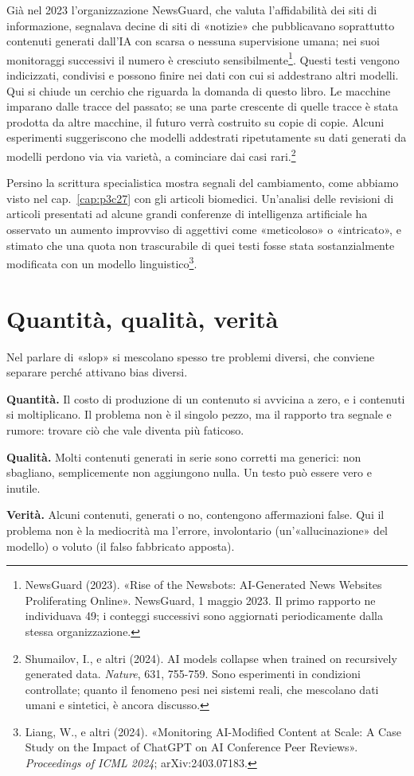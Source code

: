 Già nel 2023 l'organizzazione NewsGuard, che valuta l'affidabilità dei siti di informazione, segnalava decine di siti di «notizie» che pubblicavano soprattutto contenuti generati dall'IA con scarsa o nessuna supervisione umana; nei suoi monitoraggi successivi il numero è cresciuto sensibilmente\footnote{NewsGuard (2023). «Rise of the Newsbots: AI-Generated News Websites Proliferating Online». NewsGuard, 1 maggio 2023. Il primo rapporto ne individuava 49; i conteggi successivi sono aggiornati periodicamente dalla stessa organizzazione.}. Questi testi vengono indicizzati, condivisi e possono finire nei dati con cui si addestrano altri modelli. Qui si chiude un cerchio che riguarda la domanda di questo libro. Le macchine imparano dalle tracce del passato; se una parte crescente di quelle tracce è stata prodotta da altre macchine, il futuro verrà costruito su copie di copie. Alcuni esperimenti suggeriscono che modelli addestrati ripetutamente su dati generati da modelli perdono via via varietà, a cominciare dai casi rari.\footnote{Shumailov, I., e altri (2024). AI models collapse when trained on recursively generated data. \textit{Nature}, 631, 755-759. Sono esperimenti in condizioni controllate; quanto il fenomeno pesi nei sistemi reali, che mescolano dati umani e sintetici, è ancora discusso.}

Persino la scrittura specialistica mostra segnali del cambiamento, come abbiamo visto nel cap.~\ref{cap:p3c27} con gli articoli biomedici. Un'analisi delle revisioni di articoli presentati ad alcune grandi conferenze di intelligenza artificiale ha osservato un aumento improvviso di aggettivi come «meticoloso» o «intricato», e stimato che una quota non trascurabile di quei testi fosse stata sostanzialmente modificata con un modello linguistico\footnote{Liang, W., e altri (2024). «Monitoring AI-Modified Content at Scale: A Case Study on the Impact of ChatGPT on AI Conference Peer Reviews». \textit{Proceedings of ICML 2024}; arXiv:2403.07183.}.

\section{Quantità, qualità, verità}
\label{sec:p4c39-tre-assi}

Nel parlare di «slop» si mescolano spesso tre problemi diversi, che conviene separare perché attivano bias diversi.

\begin{concetto}
\textbf{Quantità.} Il costo di produzione di un contenuto si avvicina a zero, e i contenuti si moltiplicano. Il problema non è il singolo pezzo, ma il rapporto tra segnale e rumore: trovare ciò che vale diventa più faticoso.

\textbf{Qualità.} Molti contenuti generati in serie sono corretti ma generici: non sbagliano, semplicemente non aggiungono nulla. Un testo può essere vero e inutile.

\textbf{Verità.} Alcuni contenuti, generati o no, contengono affermazioni false. Qui il problema non è la mediocrità ma l'errore, involontario (un'«allucinazione» del modello) o voluto (il falso fabbricato apposta).
\end{concetto}

